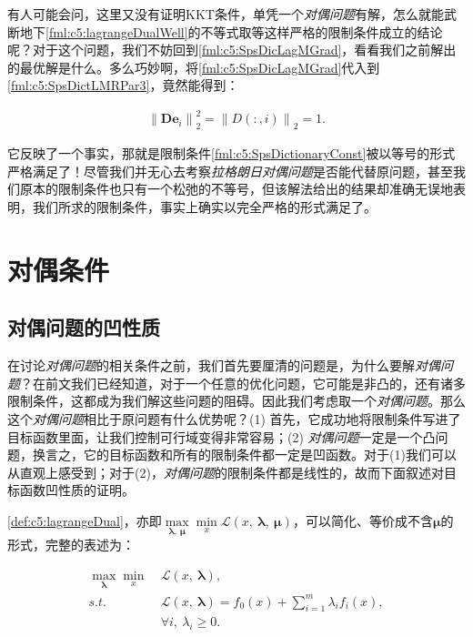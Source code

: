 有人可能会问，这里又没有证明KKT条件，单凭一个\emph{对偶问题}有解，怎么就能武断地下\eqref{fml:c5:lagrangeDualWell}的不等式取等这样严格的限制条件成立的结论呢？对于这个问题，我们不妨回到\eqref{fml:c5:SpsDicLagMGrad}，看看我们之前解出的最优解是什么。多么巧妙啊，将\eqref{fml:c5:SpsDicLagMGrad}代入到\eqref{fml:c5:SpsDictLMRPar3}，竟然能得到：

\begin{equation}\label{fml:c5:SpsDictLMRPar4}
	\begin{aligned}
		{\lVert \mathbf{D} \mathbf{e}_i \rVert}^2_2 = {\lVert D(:,i) \rVert}_2 = 1.
	\end{aligned}
\end{equation}

它反映了一个事实，那就是限制条件\eqref{fml:c5:SpsDictionaryConst}被以等号的形式严格满足了！尽管我们并无心去考察\emph{拉格朗日对偶问题}是否能代替原问题，甚至我们原本的限制条件也只有一个松弛的不等号，但该解法给出的结果却准确无误地表明，我们所求的限制条件，事实上确实以完全严格的形式满足了。

\section{对偶条件}

\subsection{对偶问题的凹性质}

在讨论\emph{对偶问题}的相关条件之前，我们首先要厘清的问题是，为什么要解\emph{对偶问题}？在前文我们已经知道，对于一个任意的优化问题，它可能是非凸的，还有诸多限制条件，这都成为我们解这些问题的阻碍。因此我们考虑取一个\emph{对偶问题}。那么这个\emph{对偶问题}相比于原问题有什么优势呢？(1) 首先，它成功地将限制条件写进了目标函数里面，让我们控制可行域变得非常容易；(2) \emph{对偶问题}一定是一个凸问题，换言之，它的目标函数和所有的限制条件都一定是凹函数。对于(1)我们可以从直观上感受到；对于(2)，\emph{对偶问题}的限制条件都是线性的，故而下面叙述对目标函数凹性质的证明。

\begin{lemma}[对偶问题的等价简化] \label{lem:c5:DualSimplified}
	\autoref{def:c5:lagrangeDual}，亦即$\max\limits_{\bm{\lambda},~\bm{\mu}} \min\limits_x \mathcal{L}(x,~\bm{\lambda},~\bm{\mu})$，可以简化、等价成不含$\bm{\mu}$的形式，完整的表述为：
	
	\begin{subequations}
		\renewcommand{\theequation}
		{\theparentequation-\arabic{equation}}
		\begin{align}
			\max\limits_{\bm{\lambda}}\min_{x}~&\mathcal{L}(x,~\bm{\lambda}), \label{fml:c5:lagSimp}\\
			s.t.~&\mathcal{L}(x,~\bm{\lambda})=f_0(x)+\sum\limits_{i=1}^{m}{\lambda_i f_i(x)}, \label{fml:c5:lagSimpDualFunc}\\
			&\forall i,~\lambda_i \geqslant 0.\label{fml:c5:lagDualSimpFuncConst}
		\end{align}
	\end{subequations}
\end{lemma}

